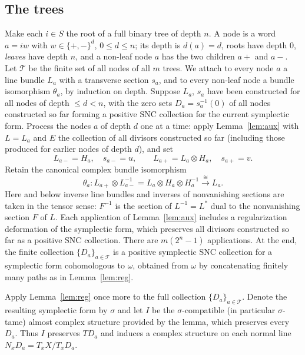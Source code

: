 \documentclass[11pt]{article}
\theoremstyle{remark}
\newcommand{\cT}{\mathcal T}
\begin{document}
\subsection*{The trees}
Make each $i\in S$ the root of a full binary tree of depth $n$. A node
is a word $a=iw$ with $w\in\{+,-\}^{d}$, $0\le d\le n$; its depth is
$d(a)=d$, roots have depth $0$, \emph{leaves} have depth $n$, and a
non-leaf node $a$ has the two children $a+$ and $a-$. Let $\cT$ be the
finite set of all nodes of all $m$ trees. We attach to every node $a$ a
line bundle $L_a$ with a transverse section $s_a$, and to every non-leaf
node a bundle isomorphism $\theta_a$, by induction on depth.
Suppose $L_a$, $s_a$ have been constructed for all nodes of depth
$\le d<n$, with the zero sets $D_a=s_a^{-1}(0)$ of all nodes constructed
so far forming a positive SNC collection for the current symplectic
form. Process the nodes $a$ of depth $d$ one at a time: apply
Lemma~\ref{lem:aux} with $L=L_a$ and $E$ the collection of all
divisors constructed so far (including those produced for earlier nodes
of depth $d$), and set
\[
 L_{a-}=H_a,\quad s_{a-}=u,\qquad
 L_{a+}=L_a\otimes H_a,\quad s_{a+}=v .
\]
Retain the canonical complex bundle isomorphism
\begin{equation}\label{eq:theta}
 \theta_a\colon L_{a+}\otimes L_{a-}^{-1}
 =L_a\otimes H_a\otimes H_a^{-1}\xrightarrow{\ \cong\ }L_a .
\end{equation}
Here and below inverse line bundles and inverses of nonvanishing
sections are taken in the tensor sense: $F^{-1}$ is the section of
$L^{-1}=L^*$ dual to the nonvanishing section $F$ of $L$. Each
application of Lemma~\ref{lem:aux} includes a regularization
deformation of the symplectic form, which preserves all divisors
constructed so far as a positive SNC collection. There are
$m(2^n-1)$ applications. At the end, the finite collection
$\{D_a\}_{a\in\cT}$ is a positive symplectic SNC collection for a
symplectic form cohomologous to $\omega$, obtained from $\omega$ by
concatenating finitely many paths as in Lemma~\ref{lem:reg}.

Apply Lemma~\ref{lem:reg} once more to the full collection
$\{D_a\}_{a\in\cT}$. Denote the resulting symplectic form by $\sigma$
and let $I$ be the $\sigma$-compatible (in particular $\sigma$-tame)
almost complex structure provided by the lemma, which preserves every
$D_a$. Thus $I$ preserves $TD_a$ and induces a complex structure on
each normal line $N_xD_a=T_xX/T_xD_a$.
\end{document}

